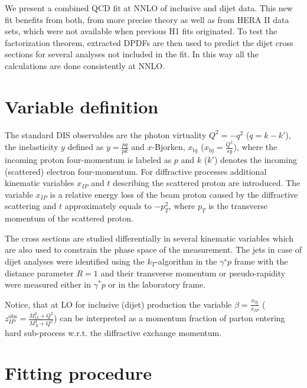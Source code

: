 \documentclass{PoS}
\newcommand{\IP}{I\!\!P}
\begin{document}
We present a combined QCD fit at NNLO of inclusive and dijet data.
This new fit benefits from both, from more precise theory as well as from HERA II data sets, which were not available when previous H1 fits originated.
To test the factorization theorem, extracted DPDFs are then used to predict the dijet cross sections for several analyses not included in the fit. 
In this way all the calculations are done consistently at NNLO.


\section{Variable definition}
The standard DIS observables are the photon virtuality $Q^2 = −q^2$ ($q = k - k'$), the inelasticity $y$ defined as $y = \frac{pq}{pk}$ and $x$-Bjorken, $x_\mathrm{bj}$ ($x_\mathrm{bj}=\frac{Q^2}{sy}$), where the incoming proton four-momentum is labeled as $p$ and $k$ ($k'$) denotes the incoming (scattered) electron four-momentum. 
For diffractive processes additional kinematic variables $x_{\IP}$ and  $t$ describing the scattered proton are introduced.
The variable $x_{\IP}$ is a relative energy loss of the beam proton caused by the diffractive scattering and $t$ approximately equals to  $-p_T^2$, where $p_T$ is the transverse momentum of the scattered proton.

The cross sections are studied differentially in several kinematic variables which are also used to constrain the phase space of the measurement.
The jets in case of dijet analyses were identified using the $k_T$-algorithm in the $\gamma^{∗}p$ frame with the distance parameter $R = 1$ and their transverse momentum or pseudo-rapidity were measured either in $\gamma^{*}p$ or in the laboratory frame.

Notice, that at LO for inclusive (dijet) production the variable $\beta = \frac{x_\mathrm{bj}}{x_{\IP}}$ ($z^\mathrm{obs}_{\IP} = \frac{M_{12}^2 + Q^2}{M_X^2 + Q^2}$) can be interpreted as a momentum fraction of parton entering hard sub-process w.r.t. the diffractive exchange momentum.



\section{Fitting procedure}
\end{document}

